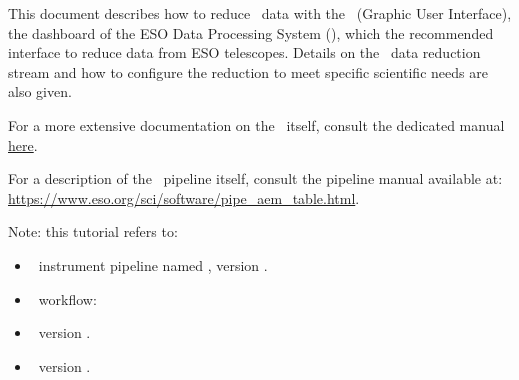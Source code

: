 This document describes how to reduce \instname\ data with
the \edpsgui\ (Graphic User Interface), the dashboard  of the ESO Data
Processing System (\edps), which the recommended interface to reduce
data from ESO telescopes.
Details on the \instname\ data reduction stream and how to configure
the reduction to meet specific scientific needs are also given.


For a more extensive documentation on the \edpsgui\ itself, consult
the dedicated
manual \href{https://edps.readthedocs.io/en/latest/edpsgui/index.html}{here}.

For a description of the \instname\ pipeline itself, consult the pipeline manual available at:\\
\href{https://www.eso.org/sci/software/pipe_aem_table.html}{https://www.eso.org/sci/software/pipe\_aem\_table.html}.

Note: this tutorial refers to:
\begin{itemize}
\item \instname\ instrument pipeline named \pipename,
version \pipelinevers.
\item \instname\ workflow: \wkfname
\item \edps\ version \edpsversion.
\item \edpsgui\ version \edpsguiversion.
\end{itemize}
